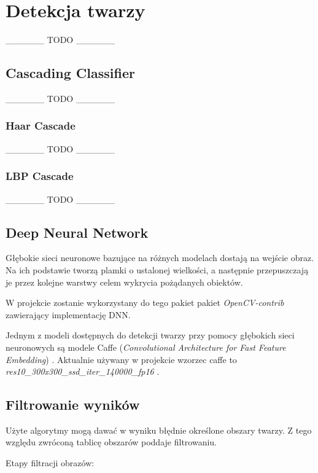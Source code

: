 \newpage

\section{Detekcja twarzy} \label{section:face_detection}
\_\_\_\_\_\_ TODO \_\_\_\_\_\_ 
\subsection{Cascading Classifier}
\_\_\_\_\_\_ TODO \_\_\_\_\_\_ 
\subsubsection{Haar Cascade}
\_\_\_\_\_\_ TODO \_\_\_\_\_\_ 
\subsubsection{LBP Cascade}
\_\_\_\_\_\_ TODO \_\_\_\_\_\_ 



\subsection{Deep Neural Network}
Głębokie sieci neuronowe bazujące na różnych modelach dostają na wejście obraz. Na ich podstawie tworzą plamki o ustalonej wielkości, a następnie przepuszczają je przez kolejne warstwy celem wykrycia pożądanych obiektów. 
\par
W projekcie zostanie wykorzystany do tego pakiet pakiet \textit{OpenCV-contrib} \cite{opencv_contirb} zawierający implementację DNN.
\par
Jednym z modeli dostępnych do detekcji twarzy przy pomocy głębokich sieci neuronowych są modele Caffe (\textit{Convolutional Architecture for Fast Feature Embedding}) \cite{jia2014caffe}. Aktualnie używany w projekcie wzorzec caffe to \textit{res10{\_}300x300{\_}ssd{\_}iter{\_}140000{\_}fp16} \cite{caffemodel_res10}.


\subsection{Filtrowanie wyników}
\label{section:face_detection_filter}

Użyte algorytmy mogą dawać w wyniku błędnie określone obszary twarzy. Z tego względu zwróconą tablicę obszarów poddaje filtrowaniu.
\par
Etapy filtracji obrazów:

